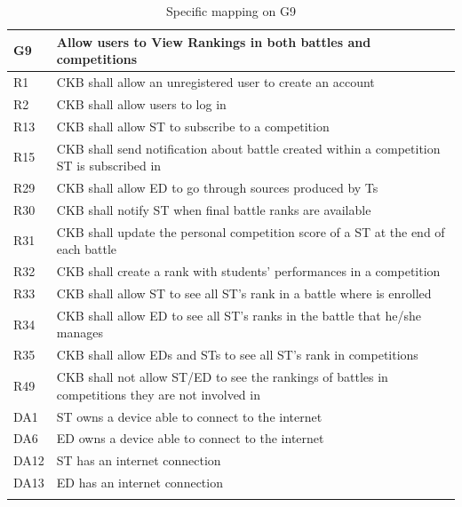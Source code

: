   \begin{longtable}{|l|p{12cm}|}
    \hline
    \textbf{G9} & \textbf{Allow users to View Rankings in both battles and competitions}      \\
    \hline
    R1 & CKB shall allow an unregistered user to create an account \\
    \hline
    R2 & CKB shall allow users to log in \\
    \hline
    R13 & CKB shall allow ST to subscribe to a competition \\
    \hline
    R15 & CKB shall send notification about battle created within a competition ST is subscribed in \\
    \hline
    R29 & CKB shall allow ED to go through sources produced by Ts \\
    \hline
    R30 & CKB shall notify ST when final battle ranks are available \\
    \hline
    R31 & CKB shall update the personal competition score of a ST at the end of each battle \\
    \hline
    R32 & CKB shall create a rank with students' performances in a competition \\
    \hline
    R33 & CKB shall allow ST to see all ST’s rank in a battle where is enrolled \\
    \hline
    R34 & CKB shall allow ED to see all ST’s ranks in the battle that he/she manages \\
    \hline
    R35 & CKB shall allow EDs and STs to see all ST’s rank in competitions \\
    \hline
    R49 & CKB shall not allow ST/ED to see the rankings of battles in competitions they are not involved in \\
    \hline
    DA1 & ST owns a device able to connect to the internet \\
    \hline
    DA6 & ED owns a device able to connect to the internet \\
    \hline
    DA12 & ST has an internet connection \\
    \hline
    DA13 & ED has an internet connection \\ 
    \hline

    \caption{Specific mapping on G9}
    \label{tab:mappingG9}
  \end{longtable}


